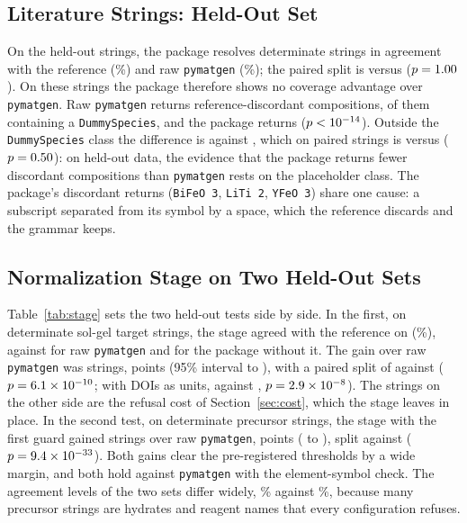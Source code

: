 \documentclass[10pt,journal]{IEEEtran}
\newcommand{\pmg}{\texttt{pymatgen}\xspace}
\begin{document}
\subsection{Literature Strings: Held-Out Set}
\label{sec:lit_ho}
On the \NHoStrings{} held-out strings, the package resolves \HoAgreeVtwo{} determinate strings in agreement with the reference (\HoAgreePctVtwo\%) and raw \pmg \HoAgreePmg{} (\HoAgreePctPmg\%); the paired split is \HoMcAgreePmgA{} versus \HoMcAgreePmgB{} ($p=1.00$). On these strings the package therefore shows no coverage advantage over \pmg. Raw \pmg returns \HoDiscPmg{} reference-discordant compositions, \HoDummyPmg{} of them containing a \texttt{DummySpecies}, and the package returns \HoDiscVtwo{} ($p<10^{-14}$). Outside the \texttt{DummySpecies} class the difference is \HoDiscExDummyPmg{} against \HoDiscExDummyVtwo{}, which on paired strings is \HoMcDiscExDummyPmgA{} versus \HoMcDiscExDummyPmgB{} ($p=0.50$): on held-out data, the evidence that the package returns fewer discordant compositions than \pmg rests on the placeholder class. The package's \HoDiscVtwo{} discordant returns (\texttt{BiFeO 3}, \texttt{LiTi 2}, \texttt{YFeO 3}) share one cause: a subscript separated from its symbol by a space, which the reference discards and the grammar keeps.

\subsection{Normalization Stage on Two Held-Out Sets}
\label{sec:stage_results}
Table~\ref{tab:stage} sets the two held-out tests side by side. In the first, on \StOneDet{} determinate sol-gel target strings, the stage agreed with the reference on \StOneAgree{} (\StOneAgreePct\%), against \HoAgreePmg{} for raw \pmg and \HoAgreeVtwo{} for the package without it. The gain over raw \pmg was \StOneGainPmg{} strings, \StOneDiffPmg{} points (95\% interval \StOneLoPmg{} to \StOneHiPmg), with a paired split of \StOneMcAPmg{} against \StOneMcBPmg{} ($p=6.1\times10^{-10}$; with DOIs as units, \StOneDoiAPmg{} against \StOneDoiBPmg, $p=2.9\times10^{-8}$). The \StOneMcBPmg{} strings on the other side are the refusal cost of Section~\ref{sec:cost}, which the stage leaves in place. In the second test, on \StTwoDet{} determinate precursor strings, the stage with the first guard gained \StTwoGainPmg{} strings over raw \pmg, \StTwoDiffPmg{} points (\StTwoLoPmg{} to \StTwoHiPmg), split \StTwoMcAPmg{} against \StTwoMcBPmg{} ($p=9.4\times10^{-33}$). Both gains clear the pre-registered thresholds by a wide margin, and both hold against \pmg with the element-symbol check. The agreement levels of the two sets differ widely, \StOneAgreePct\% against \StTwoAgreePctStage\%, because many precursor strings are hydrates and reagent names that every configuration refuses.
\end{document}
